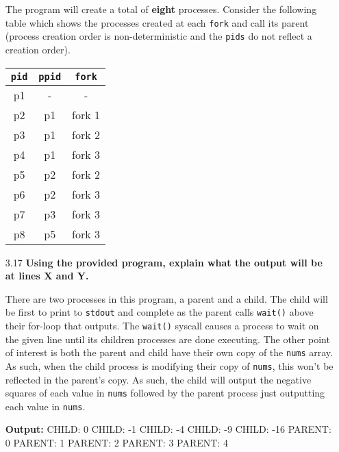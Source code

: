 \documentclass[11pt, letterpaper]{hw}
\begin{document}
\begin{enumerate}
The program will create a total of \textbf{eight} processes. Consider the following table which shows the processes created at each \texttt{fork} and call its parent (process creation order is non-deterministic and the \texttt{pids} do not reflect a creation order).

\begin{table}[H]
\centering
{\renewcommand{\arraystretch}{1.2}%
\begin{tabular}{| c | c | c |}
\hline
\texttt{pid} & \texttt{ppid} & \texttt{fork} \\
\hline
p1 & - & - \\ \hline
p2 & p1 & fork 1 \\ \hline
p3 & p1 & fork 2 \\ \hline
p4 & p1 & fork 3 \\ \hline
p5 & p2 & fork 2 \\ \hline
p6 & p2 & fork 3 \\ \hline
p7 & p3 & fork 3 \\ \hline
p8 & p5 & fork 3 \\ \hline
\end{tabular}}
\end{table}

\item [3.17] \textbf{Using the provided program, explain what the output will be at lines X and Y.}

There are two processes in this program, a parent and a child. The child will be first to print to \texttt{stdout} and complete as the parent calls \texttt{wait()} above their for-loop that outputs. The \texttt{wait()} syscall causes a process to wait on the given line until its children processes are done executing. The other point of interest is both the parent and child have their own copy of the \texttt{nums} array. As such, when the child process is modifying their copy of \texttt{nums}, this won't be reflected in the parent's copy. As such, the child will output the negative squares of each value in \texttt{nums} followed by the parent process just outputting each value in \texttt{nums}.

\textbf{Output:} CHILD: 0 CHILD: -1 CHILD: -4 CHILD: -9 CHILD: -16 PARENT: 0 PARENT: 1 PARENT: 2 PARENT: 3 PARENT: 4

\end{enumerate}
\end{document}
